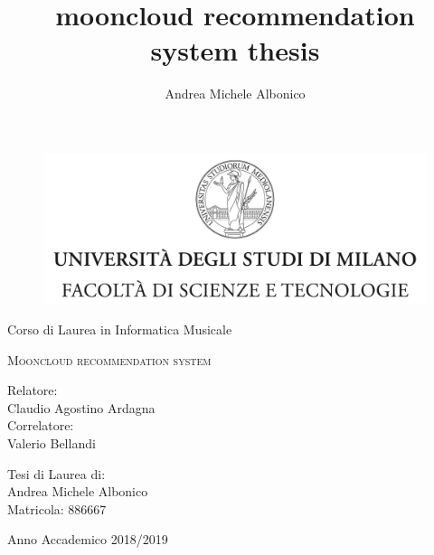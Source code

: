 \documentclass[12pt,fleqn,twoside,a4paper]{book}
\title{mooncloud recommendation system thesis}
\author{Andrea Michele Albonico}
\begin{document}
\frontmatter

\begin{titlepage}
    \begin{figure}
    	\centering
    	\includegraphics[height=5.0 cm]{logo.jpg}
    	\vspace{0.5 cm}
    \end{figure}
    \begin{center}
        {\Large Corso di Laurea in Informatica Musicale}
    \end{center}
    
    \begin{center}
        \vspace{3 cm}
        {\Large \textsc{Mooncloud recommendation system} }
    \end{center}
    \par
    \vspace{3 cm}
    \begin{flushleft}
        Relatore:\\ Claudio Agostino Ardagna\\
        \noindent Correlatore:\\ Valerio Bellandi
    \end{flushleft}
    \vspace{1 cm}
    \begin{flushright}
        Tesi di Laurea di:\\ Andrea Michele Albonico\\ Matricola: 886667
    \end{flushright}
    \vfill
    \begin{center}
    	{\Large Anno Accademico 2018/2019}
    \end{center}
\end{titlepage}





\tableofcontents
\listoffigures
\end{document}
